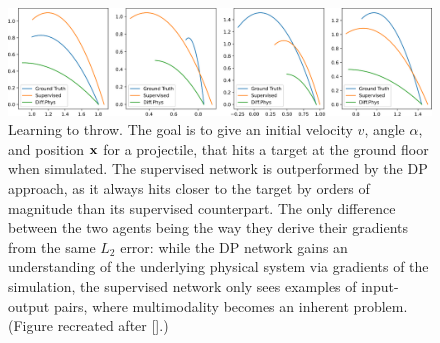 \begin{figure}
  \centering
  \includegraphics[width=\textwidth]{figures/throwing_results}
  \caption{Learning to throw. The goal is to give an initial velocity $v$, angle
    $\alpha$, and position $\vb{x}$ for a projectile, that hits a target at the
    ground floor when simulated.  The supervised network is outperformed by the
    \ac{DP} approach, as it always hits closer to the target by orders of
    magnitude than its supervised counterpart.  The only difference between the
    two agents being the way they derive their gradients from the same $L_2$
    error: while the \ac{DP} network gains an understanding of the underlying
    physical system via gradients of the simulation, the supervised network only
    sees examples of input-output pairs, where multimodality becomes an inherent
    problem.  (Figure recreated after [\cite{LearnToThrow}].)
  }
    \label{fig:learning-to-throw}
\end{figure}
